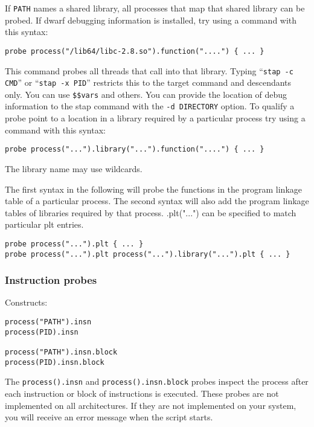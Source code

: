 \documentclass[twoside,english]{article}
\newenvironment{vindent}
{\begin{list}{}{\setlength{\listparindent}{6pt}}
\item[]}
{\end{list}}
\begin{document}
If \texttt{PATH} names a shared library, all processes that map that
shared library can be probed.  If dwarf debugging information is
installed, try using a command with this syntax:
\begin{vindent}
\begin{verbatim}
probe process("/lib64/libc-2.8.so").function("....") { ... }
\end{verbatim}
\end{vindent}
This command probes all threads that call into that library.  Typing
``\texttt{stap -c CMD}'' or ``\texttt{stap -x PID}'' restricts this to
the target command and descendants only.  You can use
\texttt{\$\$vars} and others. You can provide the location of debug
information to the stap command with the \texttt{-d DIRECTORY} option.
To qualify a probe point to a location in a library required by a
particular process try using a command with this syntax:
\begin{vindent}
\begin{verbatim}
probe process("...").library("...").function("....") { ... }
\end{verbatim}
\end{vindent}
The library name may use wildcards.

The first syntax in the following will probe the functions in the program
linkage table of a particular process.  The second syntax will also add the
program linkage tables of libraries required by that process.  .plt("...") can
be specified to match particular plt entries.
\begin{vindent}
\begin{verbatim}
probe process("...").plt { ... }
probe process("...").plt process("...").library("...").plt { ... }
\end{verbatim}
\end{vindent}

\subsubsection{Instruction probes}
\label{sec:insnprobes}
Constructs:
\begin{vindent}
\begin{verbatim}
process("PATH").insn
process(PID).insn

process("PATH").insn.block
process(PID).insn.block
\end{verbatim}
\end{vindent}
The \texttt{process().insn} and \texttt{process().insn.block} probes
inspect the process after each instruction or block of instructions is
executed. These probes are not implemented on all architectures. If
they are not implemented on your system, you will receive an error
message when the script starts.
\end{document}
